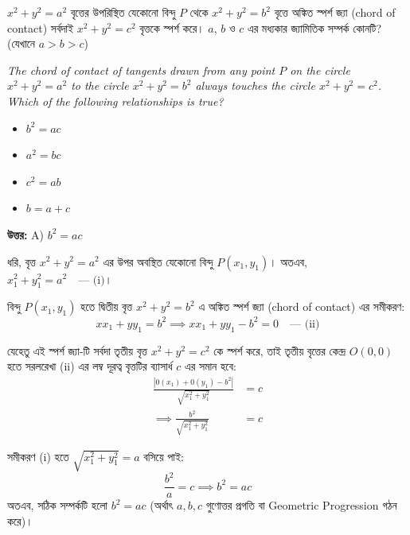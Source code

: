 \documentclass[12pt, a4paper]{article}
\begin{document}
\vspace{2em}

\begin{tcolorbox}[questionbox={প্রশ্ন (Question) 37}]
    \noindent
    $x^2 + y^2 = a^2$ বৃত্তের উপরিস্থিত যেকোনো বিন্দু $P$ থেকে $x^2 + y^2 = b^2$ বৃত্তে অঙ্কিত স্পর্শ জ্যা (chord of contact) সর্বদাই $x^2 + y^2 = c^2$ বৃত্তকে স্পর্শ করে। $a$, $b$ ও $c$ এর মধ্যকার জ্যামিতিক সম্পর্ক কোনটি? (যেখানে $a > b > c$)
    
    \vspace{0.8em}
    \begin{english}
    \noindent\textit{\color{darkgray}
    The chord of contact of tangents drawn from any point $P$ on the circle $x^2 + y^2 = a^2$ to the circle $x^2 + y^2 = b^2$ always touches the circle $x^2 + y^2 = c^2$. Which of the following relationships is true?
    }
    \end{english}
\end{tcolorbox}

\vspace{1em}
\begin{itemize}[label={}, leftmargin=1cm, itemsep=0.5em]
    \item[\textbf{A)}] $b^2 = ac$
    \item[\textbf{B)}] $a^2 = bc$
    \item[\textbf{C)}] $c^2 = ab$
    \item[\textbf{D)}] $b = a + c$
\end{itemize}

\vspace{0.5em}
\begin{tcolorbox}[answerbox]
    \textbf{\color{success} উত্তর:} A) $b^2 = ac$
\end{tcolorbox}
\vspace{1em}

\begin{tcolorbox}[solutionbox={সমাধান (Solution)}]
    \noindent
    ধরি, বৃত্ত $x^2 + y^2 = a^2$ এর উপর অবস্থিত যেকোনো বিন্দু $P(x_1, y_1)$। 
    অতএব, $x_1^2 + y_1^2 = a^2 \quad \text{--- (i)}$। 
    
    বিন্দু $P(x_1, y_1)$ হতে দ্বিতীয় বৃত্ত $x^2 + y^2 = b^2$ এ অঙ্কিত স্পর্শ জ্যা (chord of contact) এর সমীকরণ:
    \[ xx_1 + yy_1 = b^2 \implies xx_1 + yy_1 - b^2 = 0 \quad \text{--- (ii)} \]
    
    যেহেতু এই স্পর্শ জ্যা-টি সর্বদা তৃতীয় বৃত্ত $x^2 + y^2 = c^2$ কে স্পর্শ করে, তাই তৃতীয় বৃত্তের কেন্দ্র $O(0, 0)$ হতে সরলরেখা (ii) এর লম্ব দূরত্ব বৃত্তটির ব্যাসার্ধ $c$ এর সমান হবে:
    \begin{align*}
        \frac{|0(x_1) + 0(y_1) - b^2|}{\sqrt{x_1^2 + y_1^2}} &= c \\
        \implies \frac{b^2}{\sqrt{x_1^2 + y_1^2}} &= c
    \end{align*}
    
    সমীকরণ (i) হতে $\sqrt{x_1^2 + y_1^2} = a$ বসিয়ে পাই:
    \[ \frac{b^2}{a} = c \implies b^2 = ac \]
    অতএব, সঠিক সম্পর্কটি হলো \textbf{$b^2 = ac$} (অর্থাৎ $a, b, c$ গুণোত্তর প্রগতি বা Geometric Progression গঠন করে)।
\end{tcolorbox}
\end{document}

